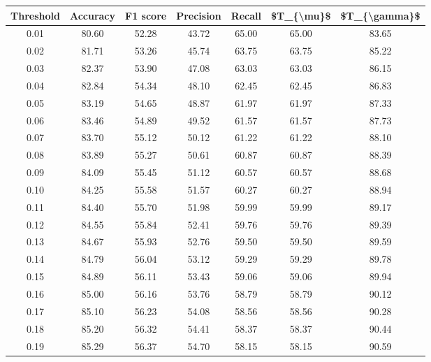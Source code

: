\begin{tabular}{|c|c|c|c|c|c|c|}
\hline
 Threshold &  Accuracy &  F1 score &  Precision &  Recall &  \$T\_\{\textbackslash mu\}\$ &  \$T\_\{\textbackslash gamma\}\$ \\
\hline
      0.01 &     80.60 &     52.28 &      43.72 &   65.00 &      65.00 &         83.65 \\
      0.02 &     81.71 &     53.26 &      45.74 &   63.75 &      63.75 &         85.22 \\
      0.03 &     82.37 &     53.90 &      47.08 &   63.03 &      63.03 &         86.15 \\
      0.04 &     82.84 &     54.34 &      48.10 &   62.45 &      62.45 &         86.83 \\
      0.05 &     83.19 &     54.65 &      48.87 &   61.97 &      61.97 &         87.33 \\
      0.06 &     83.46 &     54.89 &      49.52 &   61.57 &      61.57 &         87.73 \\
      0.07 &     83.70 &     55.12 &      50.12 &   61.22 &      61.22 &         88.10 \\
      0.08 &     83.89 &     55.27 &      50.61 &   60.87 &      60.87 &         88.39 \\
      0.09 &     84.09 &     55.45 &      51.12 &   60.57 &      60.57 &         88.68 \\
      0.10 &     84.25 &     55.58 &      51.57 &   60.27 &      60.27 &         88.94 \\
      0.11 &     84.40 &     55.70 &      51.98 &   59.99 &      59.99 &         89.17 \\
      0.12 &     84.55 &     55.84 &      52.41 &   59.76 &      59.76 &         89.39 \\
      0.13 &     84.67 &     55.93 &      52.76 &   59.50 &      59.50 &         89.59 \\
      0.14 &     84.79 &     56.04 &      53.12 &   59.29 &      59.29 &         89.78 \\
      0.15 &     84.89 &     56.11 &      53.43 &   59.06 &      59.06 &         89.94 \\
      0.16 &     85.00 &     56.16 &      53.76 &   58.79 &      58.79 &         90.12 \\
      0.17 &     85.10 &     56.23 &      54.08 &   58.56 &      58.56 &         90.28 \\
      0.18 &     85.20 &     56.32 &      54.41 &   58.37 &      58.37 &         90.44 \\
      0.19 &     85.29 &     56.37 &      54.70 &   58.15 &      58.15 &         90.59 \\

\end{tabular}
